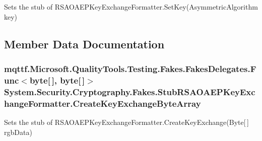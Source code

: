 Sets the stub of R\-S\-A\-O\-A\-E\-P\-Key\-Exchange\-Formatter.\-Set\-Key(\-Asymmetric\-Algorithm key)



\subsection{Member Data Documentation}
\hypertarget{class_system_1_1_security_1_1_cryptography_1_1_fakes_1_1_stub_r_s_a_o_a_e_p_key_exchange_formatter_a3ec7899ffdfd548dfa4ea72853656707}{
\subsubsection[{Create\-Key\-Exchange\-Byte\-Array}]{\setlength{\rightskip}{0pt plus 5cm}mqttf.\-Microsoft.\-Quality\-Tools.\-Testing.\-Fakes.\-Fakes\-Delegates.\-Func$<$byte\mbox{[}$\,$\mbox{]}, byte\mbox{[}$\,$\mbox{]}$>$ System.\-Security.\-Cryptography.\-Fakes.\-Stub\-R\-S\-A\-O\-A\-E\-P\-Key\-Exchange\-Formatter.\-Create\-Key\-Exchange\-Byte\-Array}}\label{class_system_1_1_security_1_1_cryptography_1_1_fakes_1_1_stub_r_s_a_o_a_e_p_key_exchange_formatter_a3ec7899ffdfd548dfa4ea72853656707}


Sets the stub of R\-S\-A\-O\-A\-E\-P\-Key\-Exchange\-Formatter.\-Create\-Key\-Exchange(\-Byte\mbox{[}$\,$\mbox{]} rgb\-Data)

